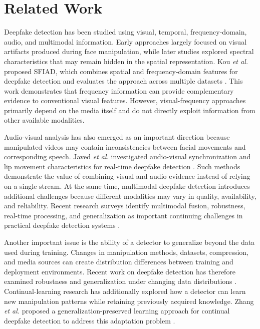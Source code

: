 \documentclass[conference]{IEEEtran}
\begin{document}
\section{Related Work}

Deepfake detection has been studied using visual, temporal, frequency-domain, audio, and multimodal information. Early approaches largely focused on visual artifacts produced during face manipulation, while later studies explored spectral characteristics that may remain hidden in the spatial representation. Kou \textit{et al.} proposed SFIAD, which combines spatial and frequency-domain features for deepfake detection and evaluates the approach across multiple datasets \cite{sfiad}. This work demonstrates that frequency information can provide complementary evidence to conventional visual features. However, visual-frequency approaches primarily depend on the media itself and do not directly exploit information from other available modalities.

Audio-visual analysis has also emerged as an important direction because manipulated videos may contain inconsistencies between facial movements and corresponding speech. Javed \textit{et al.} investigated audio-visual synchronization and lip movement characteristics for real-time deepfake detection \cite{javed2025av}. Such methods demonstrate the value of combining visual and audio evidence instead of relying on a single stream. At the same time, multimodal deepfake detection introduces additional challenges because different modalities may vary in quality, availability, and reliability. Recent research surveys identify multimodal fusion, robustness, real-time processing, and generalization as important continuing challenges in practical deepfake detection systems \cite{multimedia_survey_2025,multimodal_forgery_review_2025}.

Another important issue is the ability of a detector to generalize beyond the data used during training. Changes in manipulation methods, datasets, compression, and media sources can create distribution differences between training and deployment environments. Recent work on deepfake detection has therefore examined robustness and generalization under changing data distributions \cite{generalization_survey_2026}. Continual-learning research has additionally explored how a detector can learn new manipulation patterns while retaining previously acquired knowledge. Zhang \textit{et al.} proposed a generalization-preserved learning approach for continual deepfake detection to address this adaptation problem \cite{zhang2025continual}.
\end{document}
